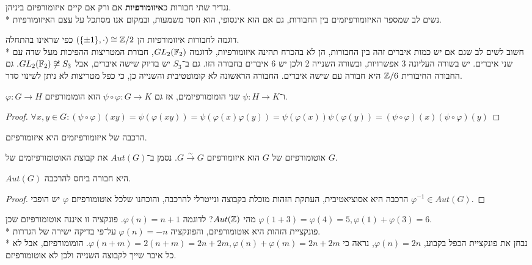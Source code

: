 \begin{definition}[איזומורפיות]
	נגדיר שתי חבורות כ\textbf{איזומורפיות} אם ורק אם קיים איזומורפיזם ביניהן. \\*
	נשים לב שמספר האיזומורפיזמים בין החבורות, גם אם הוא אינסופי, הוא חסר משמעות, ובמקום אנו מסתכל על עצם האיזומורפיות.
\end{definition}
דוגמה לחבורות איזומורפיות הן $(\{\pm 1\}, \cdot) \cong \mathbb{Z}/2$ כפי שראינו בהתחלה. \\*
חשוב לשים לב שגם אם יש כמות איברים זהה בין החבורות, הן לא בהכרח תהינה איזומורפיות, לדוגמה
$GL_2(\mathbb{F}_2)$, חבורת המטריצות ההפיכות מעל שדה עם שני איברים. יש בשורה העליונה 3 אפשרויות, ובשורה השנייה 2 ולכן יש 6 איברים בחבורה הזו.
גם ב־$S_3$ יש בדיוק שישה איברים, אבל $GL_2(\mathbb{F}_2) \not\cong S_3$. גם החבורה החיבורית $\mathbb{Z}/6$ היא חבורה עם שישה איברים. החבורה הראשונה לא קומוטטיבית והשנייה כן, כי כפל מטריצות לא ניתן לשינוי סדר.
\begin{lemma}
	$\varphi : G \to H$ ו־$\psi : H \to K$ שני הומומורפיזמים, אז גם $\psi \circ \varphi : G \to K$ הוא הומומורפיזם.
\end{lemma}
\begin{proof}
	$\forall x, y \in G : (\psi \circ \varphi) (xy) = \psi(\varphi(xy)) = \psi(\varphi(x) \varphi(y)) = \psi(\varphi(x)) \psi(\varphi(y)) = (\psi \circ \varphi)(x) (\psi \circ \varphi)(y)$
\end{proof}
\begin{conclusion}
	הרכבה של איזומורפיזמים היא איזומורפיזם.
\end{conclusion}
\begin{definition}[אוטומורפיזם]
	אוטומורפיזם של $G$ הוא איזומורפיזם $G \xrightarrow{\sim} G$. נסמן ב־$Aut(G)$ את קבוצת האוטומורפיזמים של $G$.
\end{definition}
\begin{lemma}
	$Aut(G)$ היא חבורה ביחס להרכבה.
\end{lemma}
\begin{proof}
	הרכבה היא אסוציאטיבית, העתקת הזהות מוכלת בקבוצה ונייטרלי להרכבה, והוכחנו שלכל אוטומורפיזם $\varphi$ יש הופכי $\varphi^{-1} \in Aut(G)$.
\end{proof}
מהי $Aut(\mathbb{Z})$? לדוגמה $\varphi(n) = n + 1$. פונקציה זו איננה אוטומורפיזם שכן $\varphi(1 + 3) = \varphi(4) = 5, \varphi(1) + \varphi(3) = 6$. \\*
פונקציית הזהות היא אוטומורפיזם, והפונקציה $\varphi(n) = -n$ על־פי בדיקה ישירה של הגדרות. \\*
נבחן את פונקציית הכפל בקבוע, $\varphi(n) = 2n$, נראה כי $\varphi(n + m) = 2(n + m) = 2n + 2m, \varphi(n) + \varphi(m) = 2n + 2m$. הומומורפיזם, אבל לא כל איבר שייך לקבוצה השנייה ולכן לא אוטומורפיזם.
